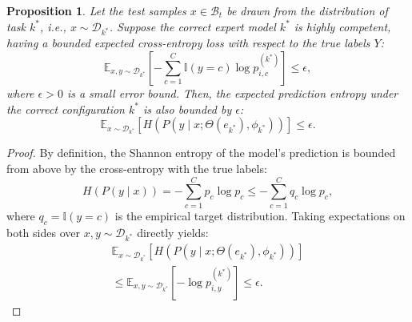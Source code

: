 \documentclass{article}
\theoremstyle{plain}
\newtheorem{proposition}[theorem]{Proposition}
\theoremstyle{definition}
\theoremstyle{remark}
\begin{document}
\begin{proposition}
Let the test samples $x \in \mathcal{B}_t$ be drawn from the distribution of task $k^*$, i.e., $x \sim \mathcal{D}_{k^*}$. Suppose the correct expert model $k^*$ is highly competent, having a bounded expected cross-entropy loss with respect to the true labels $Y$:
\begin{equation}
    \mathbb{E}_{x, y \sim \mathcal{D}_{k^*}} \left[ -\sum_{c=1}^C \mathbb{I}(y = c) \log p_{i,c}^{(k^*)} \right] \leq \epsilon,
\end{equation}
where $\epsilon > 0$ is a small error bound. Then, the expected prediction entropy under the correct configuration $k^*$ is also bounded by $\epsilon$:
\begin{equation}
    \mathbb{E}_{x \sim \mathcal{D}_{k^*}} \left[ H\left(P\left(y \mid x; \Theta(e_{k^*}), \phi_{k^*}\right)\right) \right] \leq \epsilon.
\end{equation}
\end{proposition}

\begin{proof}
By definition, the Shannon entropy of the model's prediction is bounded from above by the cross-entropy with the true labels:
\begin{equation}
    H(P(y \mid x)) = -\sum_{c=1}^C p_c \log p_c \leq -\sum_{c=1}^C q_c \log p_c,
\end{equation}
where $q_c = \mathbb{I}(y = c)$ is the empirical target distribution. Taking expectations on both sides over $x, y \sim \mathcal{D}_{k^*}$ directly yields:
\begin{align}
    \mathbb{E}_{x \sim \mathcal{D}_{k^*}} \left[ H\left(P\left(y \mid x; \Theta(e_{k^*}), \phi_{k^*}\right)\right) \right] \nonumber \\
    \leq \mathbb{E}_{x, y \sim \mathcal{D}_{k^*}} \left[ -\log p_{i, y}^{(k^*)} \right] \leq \epsilon.
\end{align}
\end{proof}
\end{document}
